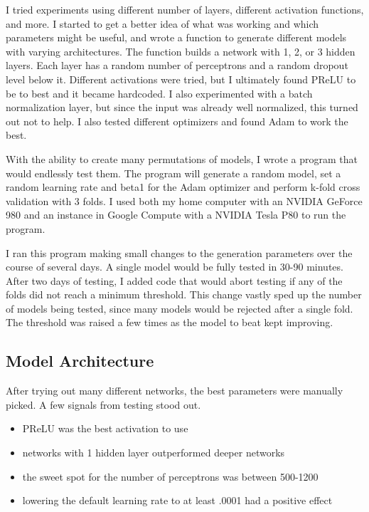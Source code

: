 \documentclass[twoside,twocolumn]{article}
\begin{document}
I tried experiments using different number of layers, different activation functions, and more.  I started to get a better idea of what was working and which parameters might be useful, and wrote a function to generate different models with varying architectures.  The function builds a network with 1, 2, or 3 hidden layers.  Each layer has a random number of perceptrons and a random dropout level below it.  Different activations were tried, but I ultimately found PReLU to be to best and it became hardcoded.  I also experimented with a batch normalization layer, but since the input was already well normalized, this turned out not to help.  I also tested different optimizers and found Adam to work the best.

With the ability to create many permutations of models, I wrote a program that would endlessly test them.  The program will generate a random model, set a random learning rate and beta1 for the Adam optimizer and perform k-fold cross validation with 3 folds.  I used both my home computer with an NVIDIA GeForce 980 and an instance in Google Compute with a NVIDIA Tesla P80 to run the program.

I ran this program making small changes to the generation parameters over the course of several days.  A single model would be fully tested in 30-90 minutes.  After two days of testing, I added code that would abort testing if any of the folds did not reach a minimum threshold.  This change vastly sped up the number of models being tested, since many models would be rejected after a single fold.  The threshold was raised a few times as the model to beat kept improving.  

\subsection {Model Architecture}

After trying out many different networks, the best parameters were manually picked.  A few signals from testing stood out. 

\begin{itemize}
\item PReLU was the best activation to use
\item networks with 1 hidden layer outperformed deeper networks
\item the sweet spot for the number of perceptrons was between 500-1200
\item lowering the default learning rate to at least .0001 had a positive effect
\end{itemize}
\end{document}
